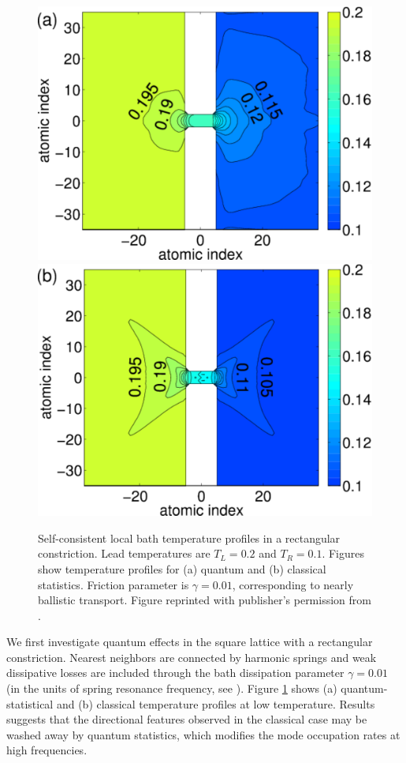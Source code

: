 \begin{figure}
 \includegraphics[width=.49\columnwidth]{pics/gf_fig7a.pdf}
 \includegraphics[width=.49\columnwidth]{pics/gf_fig7b.pdf}
 \caption{Self-consistent local bath temperature profiles in a rectangular constriction. Lead temperatures are $T_L=0.2$ and $T_R=0.1$. Figures show temperature profiles for (a) quantum and (b) classical statistics. Friction parameter is $\gamma=0.01$, corresponding to nearly ballistic transport. Figure reprinted with publisher's permission from .}
 \label{fig:gf_fig7}
\end{figure}

We first investigate quantum effects in the square lattice with a rectangular constriction. Nearest neighbors are connected by harmonic springs and weak dissipative losses are included through the bath dissipation parameter $\gamma=0.01$ (in the units of spring resonance frequency, see ). Figure \ref{fig:gf_fig7} shows (a) quantum-statistical and (b) classical temperature profiles at low temperature. Results suggests that the directional features observed in the classical case may be washed away by quantum statistics, which modifies the mode occupation rates at high frequencies. 

